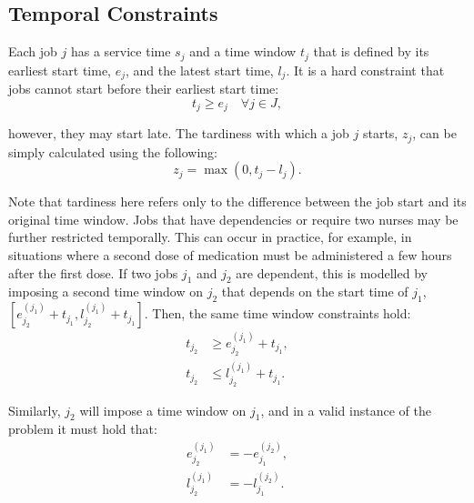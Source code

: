 \documentclass[a4paper,11pt,authoryear]{elsarticle}
\begin{document}

\subsection{Temporal Constraints}
\label{sub:temporalconstraints}
\noindent Each job $j$ has a service time $s_j$ and a time window $t_j$ that is defined by its earliest start time, $e_j$, and the latest start time, $l_j$. It is a hard constraint that jobs cannot start before their earliest start time:
\begin{equation}
    t_j \geq e_j \quad \forall j \in J, \label{eq:jobstart}
\end{equation}

\noindent however, they may start late. The tardiness with which a job $j$ starts, $z_j$, can be simply calculated using the following:
\begin{equation}
    z_j = \max(0, t_j - l_j). \label{eq:tardiness}
\end{equation}

\noindent Note that tardiness here refers only to the difference between the job start and its original time window. Jobs that have dependencies or require two nurses may be further restricted temporally. This can occur in practice, for example, in situations where a second dose of medication must be administered a few hours after the first dose. If two jobs $j_1$ and $j_2$ are dependent, this is modelled by imposing a second time window on $j_2$ that depends on the start time of $j_1$, $[e^{(j_1)}_{j_2} + t_{j_1}, l^{(j_1)}_{j_2} + t_{j_1}]$. Then, the same time window constraints hold:
\begin{subequations}
	\begin{align}
	t_{j_2} &\geq e^{(j_1)}_{j_2} + t_{j_1}, \label{eq:timewindow1}\\[3pt] %
	t_{j_2} &\leq l^{(j_1)}_{j_2} + t_{j_1}. \label{eq:timewindow2} %
	\end{align}
\end{subequations}

\noindent Similarly, $j_2$ will impose a time window on $j_1$, and in a valid instance of the problem it must hold that:
\begin{subequations}
	\begin{align}
	e^{(j_1)}_{j_2} &= -e^{(j_2)}_{j_1}, \label{eq:earliesttimedependecies}\\[3pt]
	l^{(j_1)}_{j_2} &= -l^{(j_2)}_{j_1}. \label{eq:latesttimedependencies}
	\end{align}
\end{subequations}
\end{document}
